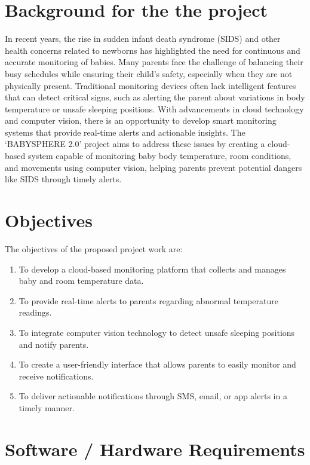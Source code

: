 \documentclass[12pt,a4paper]{report}
\begin{document}
\section*{Background for the  the project}
In recent years, the rise in sudden infant death syndrome (SIDS)\cite{moon2007sudden}
 and other health concerns related to newborns has highlighted 
 the need for continuous and accurate monitoring of babies. 
 Many parents face the challenge of balancing their busy 
 schedules while ensuring their child’s safety, especially when 
 they are not physically present. Traditional monitoring devices
  often lack intelligent features that can detect critical signs,
   such as alerting the parent about variations in body temperature or unsafe sleeping positions. With 
   advancements in cloud technology and computer vision, there 
   is an opportunity to develop smart monitoring systems that 
   provide real-time alerts and actionable insights. The 
   `BABYSPHERE 2.0' project aims to address these issues by 
   creating a cloud-based system capable of monitoring baby 
   body temperature, room conditions, and movements using 
   computer vision, helping parents prevent potential dangers 
   like SIDS through timely alerts.

\section*{Objectives }
The objectives of the proposed project work are:
\begin{enumerate}
    \item To develop a cloud-based monitoring platform that collects and manages baby and room temperature data.
    \item To provide real-time alerts to parents regarding abnormal temperature readings.
    \item To integrate computer vision technology to detect unsafe sleeping positions and notify parents.
    \item To create a user-friendly interface that allows parents to easily monitor and receive notifications.
    \item To deliver actionable notifications through SMS, email, or app alerts in a timely manner.
\end{enumerate}


\section*{Software / Hardware Requirements}
\end{document}
